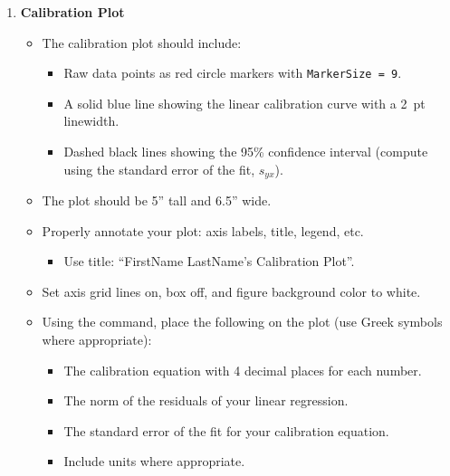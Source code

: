 \documentclass{article}
\begin{document}
\begin{enumerate}
    \item \textbf{Calibration Plot}
    \begin{itemize}
        \item The calibration plot should include:
        \begin{itemize}
            \item Raw data points as red circle markers with \texttt{MarkerSize = 9}.
            \item A solid blue line showing the linear calibration curve with a 2~pt linewidth.
            \item Dashed black lines showing the 95\% confidence interval (compute using the standard error of the fit, $s_{yx}$).
        \end{itemize}
        \item The plot should be 5'' tall and 6.5'' wide.
        \item Properly annotate your plot: axis labels, title, legend, etc.
        \begin{itemize}
            \item Use title: ``FirstName LastName's Calibration Plot''.
        \end{itemize}
        \item Set axis grid lines on, box off, and figure background color to white.
        \item Using the  command, place the following on the plot (use Greek symbols where appropriate):
        \begin{itemize}
            \item The calibration equation with 4 decimal places for each number.
            \item The norm of the residuals of your linear regression.
            \item The standard error of the fit for your calibration equation.
            \item Include units where appropriate.
        \end{itemize}
    \end{itemize}


\end{enumerate}
\end{document}
